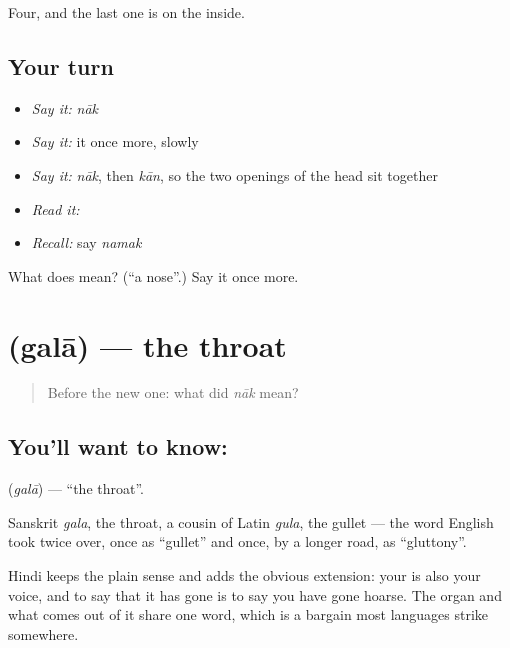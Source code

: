 \begin{grammarlens}[title={What you've built}]
Four, and the last one is on the inside.
\end{grammarlens}

\subsection*{Your turn}
\begin{itemize}
\raggedright
  \item \emph{Say it:} \emph{nāk}
  \item \emph{Say it:} it once more, slowly
  \item \emph{Say it:} \emph{nāk}, then \emph{kān}, so the two openings of the head sit together
  \item \emph{Read it:} \textbf{}
  \item \emph{Recall:} say \emph{namak}
\end{itemize}

\begin{tcolorbox}[breakable,colback=teal!4,colframe=teal!35!black,title={Before you move on}]
What does  mean? (\textquotedblleft{}a nose\textquotedblright{}.) Say it once more.
\end{tcolorbox}
\section[\texorpdfstring{\hi{गला} (galā)}{गला (galā)}]{ (galā) — the throat}

\label{lesson:HI-C46-throat}



\begin{quote}
Before the new one: what did \emph{nāk} mean?
\end{quote}

\subsection*{You'll want to know: }
\textbf{} (\emph{galā}) — \textquotedblleft{}the throat\textquotedblright{}.

Sanskrit \emph{gala}, the throat, a cousin of Latin \emph{gula}, the gullet — the word English took twice over, once as \textquotedblleft{}gullet\textquotedblright{} and once, by a longer road, as \textquotedblleft{}gluttony\textquotedblright{}.

Hindi keeps the plain sense and adds the obvious extension: your  is also your voice, and to say that it has gone is to say you have gone hoarse. The organ and what comes out of it share one word, which is a bargain most languages strike somewhere.

